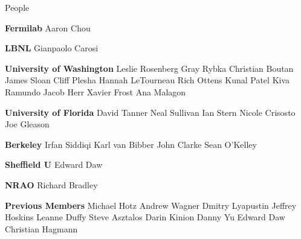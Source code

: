 \documentclass{beamer}
\begin{document}
%
%
%
%
%
%
%



\begin{frame}{People}

{\tiny \textbf{Fermilab}
Aaron Chou

\textbf{LBNL}
Gianpaolo Carosi

\textbf{University of Washington}
Leslie Rosenberg
Gray Rybka
Christian Boutan
James Sloan
Cliff Plesha
Hannah LeTourneau
Rich Ottens
Kunal Patel
Kiva Ramundo
Jacob Herr
Xavier Frost
Ana Malagon

\textbf{University of Florida}
David Tanner
Neal Sullivan
Ian Stern
Nicole Crisosto
Joe Gleason

\textbf{Berkeley}
Irfan Siddiqi
Karl van Bibber
John Clarke
Sean O'Kelley

\textbf{Sheffield U}
Edward Daw

\textbf{NRAO}
Richard Bradley

\textbf{Previous Members}
Michael Hotz
Andrew Wagner
Dmitry Lyapustin
Jeffrey Hoskins
Leanne Duffy
Steve Asztalos
Darin Kinion
Danny Yu
Edward Daw
Christian Hagmann}
\end{frame}
\end{document}

